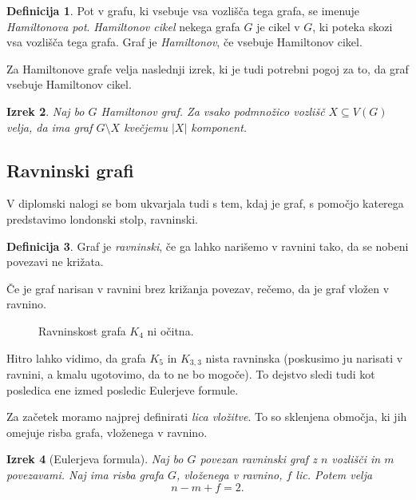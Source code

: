 \documentclass[12pt,a4paper]{amsart}
\theoremstyle{definition} %
\newtheorem{definicija}{Definicija}[section]
\theoremstyle{plain} %
\newtheorem{izrek}[definicija]{Izrek}
\begin{document}
\begin{definicija}
	Pot v grafu, ki vsebuje vsa vozlišča tega grafa, se imenuje \emph{Hamiltonova pot}.
	\emph{Hamiltonov cikel} nekega grafa $G$ je cikel v $G$, ki poteka skozi vsa vozlišča tega grafa.
	Graf je \emph{Hamiltonov}, če vsebuje Hamiltonov cikel.
\end{definicija}

Za Hamiltonove grafe velja naslednji izrek, ki je tudi potrebni pogoj za to, da graf vsebuje Hamiltonov cikel.

\begin{izrek}
	Naj bo $G$ Hamiltonov graf. Za vsako podmnožico vozlišč $X \subseteq V(G)$ velja, da ima graf $G \setminus X$ kvečjemu $|X|$ komponent.
\end{izrek}

\proof

\endproof

\subsection{Ravninski grafi}

V diplomski nalogi se bom ukvarjala tudi s tem, kdaj je graf, s pomočjo katerega predstavimo londonski stolp, ravninski.

\begin{definicija}
    Graf je \emph{ravninski}, če ga lahko narišemo v ravnini tako, da se nobeni povezavi ne križata.
\end{definicija}

Če je graf narisan v ravnini brez križanja povezav, rečemo, da je graf vložen v ravnino.

\begin{figure}[h]
    \caption{Ravninskost grafa $K_4$ ni očitna.}
\end{figure}

Hitro lahko vidimo, da grafa $K_5$ in $K_{3,3}$ nista ravninska (poskusimo ju narisati v ravnini, a kmalu ugotovimo, da to ne bo mogoče). To dejstvo sledi tudi kot posledica ene izmed posledic Eulerjeve formule.

Za začetek moramo najprej definirati \emph{lica vložitve}. To so sklenjena območja, ki jih omejuje risba grafa, vloženega v ravnino.

\begin{izrek}[Eulerjeva formula]
    Naj bo $G$ povezan ravninski graf z $n$ vozlišči in $m$ povezavami. Naj ima risba grafa $G$, vloženega v ravnino, $f$ lic. Potem velja
    \[ n - m + f = 2 .\]
\end{izrek}
\end{document}
